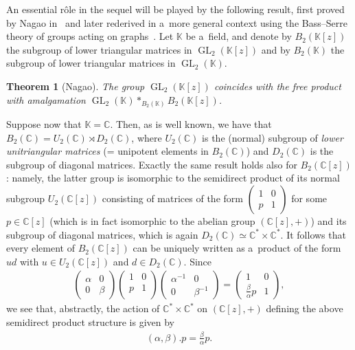 \documentclass[11pt]{article}
\newtheorem{theorem}{Theorem}
\newcommand{\bb}[1]{\mathbb{#1}}
\newcommand{\smm}[1]{\left(\begin{smallmatrix} #1\end{smallmatrix}\right)}
\DeclareMathOperator{\GL}{GL}
\begin{document}
An essential r\^ole in the sequel will be played by the following result, f\/irst proved by Nagao
in~\cite{naga59} and later rederived in a~more general context using the Bass--Serre theory of groups acting
on graphs~\cite{serre80}.
Let \(\bb{K}\) be a~f\/ield, and denote by \(B_{2}(\bb{K}[z])\) the subgroup of lower triangular matrices
in \(\GL_{2}(\bb{K}[z])\) and by \(B_{2}(\bb{K})\) the subgroup of lower triangular matrices in
\(\GL_{2}(\bb{K})\).
\begin{theorem}[Nagao]
\label{teo:nagao}
The group \(\GL_{2}(\bb{K}[z])\) coincides with the free product with amalgamation
\(\GL_{2}(\bb{K})\ast_{B_{2}(\bb{K})} B_{2}(\bb{K}[z])\).
\end{theorem}
Suppose now that \(\bb{K}=\bb{C}\).
Then, as is well known, we have that \(B_{2}(\bb{C}) = U_{2}(\bb{C})\rtimes D_{2}(\bb{C})\), where
\(U_{2}(\bb{C})\) is the (normal) subgroup of \emph{lower unitriangular matrices} (= unipotent elements in
\(B_{2}(\bb{C})\)) and \(D_{2}(\bb{C})\) is the subgroup of diagonal matrices.
Exactly the same result holds also for \(B_{2}(\bb{C}[z])\): namely, the latter group is isomorphic to the
semidirect product of its normal subgroup \(U_{2}(\bb{C}[z])\) consisting of matrices of the form \(\smm{1
& 0
\\
p & 1}\) for some \(p\in \bb{C}[z]\) (which is in fact isomorphic to the abelian group \((\bb{C}[z],+)\))
and its subgroup of diagonal matrices, which is again \(D_{2}(\bb{C})\simeq \bb{C}^{*}\times \bb{C}^{*}\).
It follows that every element of \(B_{2}(\bb{C}[z])\) can be uniquely written as a~product of the form
\(ud\) with \(u\in U_{2}(\bb{C}[z])\) and \(d\in D_{2}(\bb{C})\).
Since
\begin{gather*}
\begin{pmatrix}
\alpha&0
\\
0&\beta
\end{pmatrix}
\begin{pmatrix}
1&0
\\
p&1
\\
\end{pmatrix}
\begin{pmatrix}
\alpha^{-1}&0
\\
0&\beta^{-1}
\end{pmatrix}
=
\begin{pmatrix}
1&0
\\
\frac{\beta}{\alpha}p&1
\end{pmatrix},
\end{gather*}
we see that, abstractly, the action of \(\bb{C}^{*}\times \bb{C}^{*}\) on \((\bb{C}[z],+)\) def\/ining the
above semidirect product structure is given by
\begin{gather}
\label{eq:smdp-act}
(\alpha,\beta).p=\frac{\beta}{\alpha}p.
\end{gather}
\end{document}
